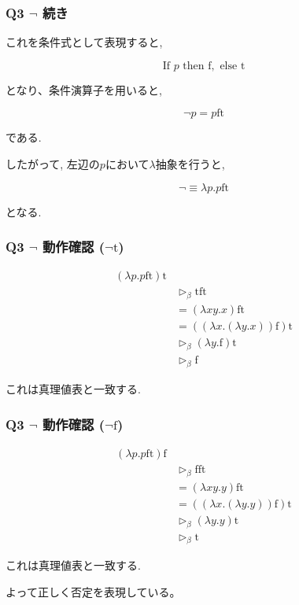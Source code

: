 \begin{frame}[fragile]

\frametitle{Q3 $\neg$ 続き}

これを条件式として表現すると, 

\[
\text{If }p\text{ then }\text{f},
\text{ else }\text{t}
\]

となり、条件演算子を用いると, 

\[
\neg p
=
p\text{ft}
\]

である.

したがって, 左辺の$p$において$\lambda$抽象を行うと, 

\[
\boxed{
\neg
\equiv
\lambda p.p\text{ft}
}
\]

となる.

\end{frame}

\begin{frame}[fragile]

\frametitle{Q3 $\neg$ 動作確認 ($\neg \text{t}$)}

\begin{align*}
(\lambda p.p\mathrm{ft})\mathrm{t}
\\
&\triangleright_{\beta}
\mathrm{tft}
\\
&=
(\lambda xy.x)\mathrm{ft}
\\
&=
((\lambda x.(\lambda y.x))
\mathrm{f})\mathrm{t}
\\
&\triangleright_{\beta}
(\lambda y.\mathrm{f})\mathrm{t}
\\
&\triangleright_{\beta}
\mathrm{f}
\end{align*}

これは真理値表と一致する.

\end{frame}

\begin{frame}[fragile]

\frametitle{Q3 $\neg$ 動作確認 ($\neg \text{f}$)}

\begin{align*}
(\lambda p.p\mathrm{ft})\mathrm{f}
\\
&\triangleright_{\beta}
\mathrm{fft}
\\
&=
(\lambda xy.y)\mathrm{ft}
\\
&=
((\lambda x.(\lambda y.y))
\mathrm{f})\mathrm{t}
\\
&\triangleright_{\beta}
(\lambda y.y)\mathrm{t}
\\
&\triangleright_{\beta}
\mathrm{t}
\end{align*}

これは真理値表と一致する. 

よって正しく否定を表現している。
\end{frame}
